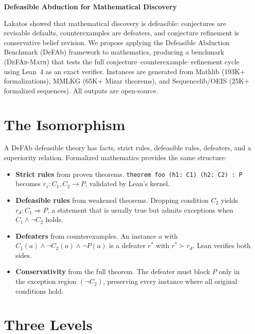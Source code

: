 \documentclass[11pt]{article}
\newcommand{\defto}{\Rightarrow}
\newcommand{\strictto}{\rightarrow}
\begin{document}
\begin{center}
{\Large\bfseries Defeasible Abduction for Mathematical Discovery}
\end{center}

\bigskip

\noindent
Lakatos showed that mathematical discovery is defeasible: conjectures
are revisable defaults, counterexamples are defeaters, and conjecture
refinement is conservative belief revision. We propose applying the
Defeasible Abduction Benchmark (DeFAb) framework to mathematics,
producing a benchmark (\textsc{DeFAb-Math}) that tests the full
conjecture--counterexample--refinement cycle using Lean~4 as an exact
verifier. Instances are generated from Mathlib (193K+ formalizations),
MMLKG (65K+ Mizar theorems), and Sequencelib/OEIS (25K+ formalized
sequences). All outputs are open-source.

\bigskip

\section*{The Isomorphism}

A DeFAb defeasible theory has facts, strict rules, defeasible rules,
defeaters, and a superiority relation. Formalized mathematics provides
the same structure:

\begin{itemize}[nosep]
\item \textbf{Strict rules} from proven theorems.
  \texttt{theorem foo (h1:~C1) (h2:~C2) : P} becomes
  $r_s\colon C_1, C_2 \strictto P$, validated by Lean's kernel.

\item \textbf{Defeasible rules} from weakened theorems. Dropping
  condition $C_2$ yields $r_d\colon C_1 \defto P$, a statement that is
  usually true but admits exceptions when $C_1 \wedge \neg C_2$ holds.

\item \textbf{Defeaters} from counterexamples. An instance $a$ with
  $C_1(a) \wedge \neg C_2(a) \wedge \neg P(a)$ is a defeater
  $r^*$ with $r^* \succ r_d$. Lean verifies both sides.

\item \textbf{Conservativity} from the full theorem. The defeater must
  block $P$ only in the exception region $(\neg C_2)$, preserving
  every instance where all original conditions hold.
\end{itemize}

\section*{Three Levels}
\end{document}
